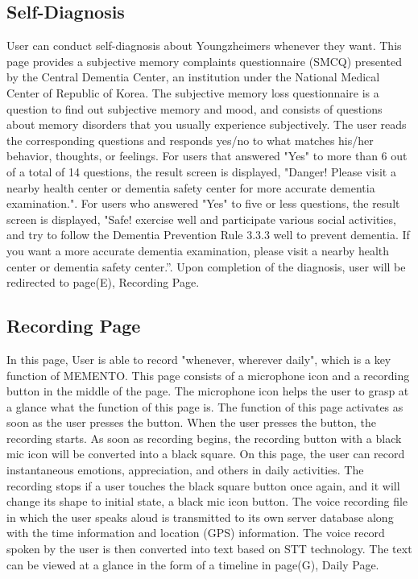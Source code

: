 \documentclass[conference]{IEEEtran}
\begin{document}
\subsection{Self-Diagnosis}
User can conduct self-diagnosis about Youngzheimers whenever they want. This page provides a subjective memory complaints questionnaire (SMCQ) presented by the Central Dementia Center, an institution under the National Medical Center of Republic of Korea. The subjective memory loss questionnaire is a question to find out subjective memory and mood, and consists of questions about memory disorders that you usually experience subjectively. The user reads the corresponding questions and responds yes/no to what matches his/her behavior, thoughts, or feelings. For users that answered "Yes" to more than 6 out of a total of 14 questions, the result screen is displayed, "Danger! Please visit a nearby health center or dementia safety center for more accurate dementia examination.". For users who answered "Yes" to five or less questions, the result screen is displayed, "Safe! exercise well and participate various social activities, and try to follow the Dementia Prevention Rule 3.3.3 well to prevent dementia. If you want a more accurate dementia examination, please visit a nearby health center or dementia safety center.”. Upon completion of the diagnosis, user will be redirected to page(E), Recording Page.
\\
\subsection{Recording Page}
In this page, User is able to record "whenever, wherever daily", which is a key function of MEMENTO. This page consists of a microphone icon and a recording button in the middle of the page. The microphone icon helps the user to grasp at a glance what the function of this page is. The function of this page activates as soon as the user presses the button. When the user presses the button, the recording starts. As soon as recording begins, the recording button with a black mic icon will be converted into a black square. On this page, the user can record instantaneous emotions, appreciation, and others in daily activities. The recording stops if a user touches the black square button once again, and it will change its shape to initial state, a black mic icon button. The voice recording file in which the user speaks aloud is transmitted to its own server database along with the time information and location (GPS) information. The voice record spoken by the user is then converted into text based on STT technology. The text can be viewed at a glance in the form of a timeline in page(G), Daily Page.
\\
\end{document}
